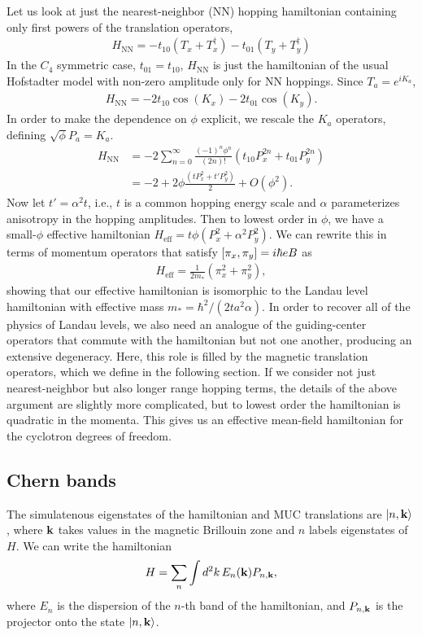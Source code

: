 \documentclass[aps,prb,twocolumn,letterpaper,twoside,nobalancelastpage,groupedaddress,amsmath,amssymb,floatfix,citeautoscript]{revtex4-1}
\begin{document}
Let us look at just the nearest-neighbor (NN) hopping hamiltonian containing only first powers of the translation operators,
\begin{align*}
H_{\text{NN}} = -t_{10}\left(T_x + T_x^{\dag}\right) - t_{01}\left(T_y + T_y^{\dag}\right)
\end{align*}
In the $C_4$ symmetric case, $t_{01} = t_{10}$, $H_{\text{NN}}$ is just the hamiltonian of the usual Hofstadter model with non-zero amplitude only for NN hoppings. Since $T_a = e^{iK_a}$,
\begin{align*}
H_{\text{NN}}= -2t_{10}\cos\left(K_x\right) - 2 t_{01}\cos\left(K_y\right).
\end{align*}
In order to make the dependence on $\phi$ explicit, we rescale the $K_a$ operators, defining $\sqrt{\phi} P_a = K_a$. 
\begin{align*}
H_{\text{NN}} &= -2\sum_{n=0}^{\infty}  \frac{(-1)^{n}\phi^{n}}{(2n)!} \left(t_{10} P^{2n}_x + t_{01}P^{2n}_y\right)\\
&= -2 + 2\phi\frac{\left(t P^{2}_x + t' P^{2}_y\right)}{2} +O(\phi^2).
\end{align*}
Now let $t' = \alpha^2 t$, i.e., $t$ is a common hopping energy scale and $\alpha$ parameterizes anisotropy in the hopping amplitudes. Then to lowest order in $\phi$, we have a small-$\phi$ effective hamiltonian $H_{\text{eff}}= t\phi \left(P^{2}_x + \alpha^2P^{2}_y\right)$. We can rewrite this in terms of momentum operators that satisfy $\comm{\pi_x}{\pi_y} = i\hbar e B$ as
\begin{align*}
H_{\text{eff}} = \frac{1}{2m_{\ast}}\left(\pi_x^2 + \pi_y^2\right),
\end{align*}
showing that our effective hamiltonian is isomorphic to the Landau level hamiltonian with effective mass $m_{\ast} = \hbar^2/(2ta^2\alpha)$. In order to recover all of the physics of Landau levels, we also need an analogue of the guiding-center operators that commute with the hamiltonian but not one another, producing an extensive degeneracy. Here, this role is filled by the magnetic translation operators, which we define in the following section. If we consider not just nearest-neighbor but also longer range hopping terms, the details of the above argument are slightly more complicated, but to lowest order the hamiltonian is quadratic in the momenta. This gives us an effective mean-field hamiltonian for the cyclotron degrees of freedom. 

\subsection{Chern bands}
The simulatenous eigenstates of the hamiltonian and MUC translations are $\ket{n,{\bf k}}$, where ${\bf k}$ takes values in the magnetic Brillouin zone and $n$ labels eigenstates of $H$. We can write the hamiltonian 
\begin{align}
\label{band-projector-ham}
H = \sum_{n}\int d^2k\, E_{n}({\bf k}) P_{n,{\bf k}},
\end{align}
where $E_n$ is the dispersion of the $n$-th band of the hamiltonian, and $P_{n,{\bf k}}$ is the projector onto the state $\ket{n,{\bf k}}$.
\end{document}

